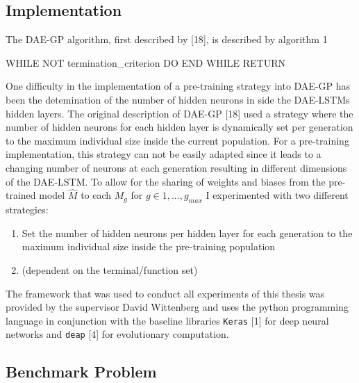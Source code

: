 \documentclass[
  11pt,
]{article}
\newenvironment{Shaded}{\begin{snugshade}}{\end{snugshade}}
\newcommand{\NormalTok}[1]{#1}
\providecommand{\tightlist}{%
  \setlength{\itemsep}{0pt}\setlength{\parskip}{0pt}}
\begin{document}
\hypertarget{implementation}{%
\subsection{Implementation}\label{implementation}}

The DAE-GP algorithm, first described by {[}18{]}, is described by
algorithm 1

\begin{Shaded}
\begin{Highlighting}[numbers=left,,]
\NormalTok{WHILE NOT termination\_criterion}
\NormalTok{  DO }
\NormalTok{END WHILE}
\NormalTok{RETURN}
\end{Highlighting}
\end{Shaded}

One difficulty in the implementation of a pre-training strategy into
DAE-GP has been the detemination of the number of hidden neurons in side
the DAE-LSTMs hidden layers. The original description of DAE-GP {[}18{]}
used a strategy where the number of hidden neurons for each hidden layer
is dynamically set per generation to the maximum individual size inside
the current population. For a pre-training implementation, this strategy
can not be easily adapted since it leads to a changing number of neurons
at each generation resulting in different dimensions of the DAE-LSTM. To
allow for the sharing of weights and biases from the pre-trained model
\(\hat{M}\) to each \(M_g\) for \(g\in{1,...,g_{max}}\) I experimented
with two different strategies:

\begin{enumerate}
\def\labelenumi{\arabic{enumi}.}
\tightlist
\item
  Set the number of hidden neurons per hidden layer for each generation
  to the maximum individual size inside the pre-training population
\item
  (dependent on the terminal/function set)
\end{enumerate}

The framework that was used to conduct all experiments of this thesis
was provided by the supervisor David Wittenberg and uses the python
programming language in conjunction with the baseline libraries
\texttt{Keras} {[}1{]} for deep neural networks and \texttt{deap}
{[}4{]} for evolutionary computation.

\hypertarget{benchmark-problem}{%
\subsection{Benchmark Problem}\label{benchmark-problem}}
\end{document}

